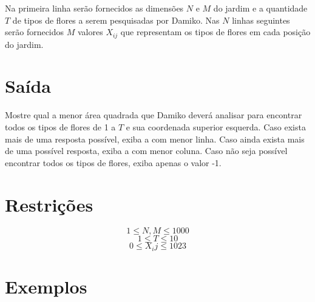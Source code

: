 Na primeira linha serão fornecidos as dimensões $N$ e $M$ do jardim e a quantidade $T$ de tipos de flores a serem pesquisadas por Damiko.
 Nas $N$ linhas seguintes serão fornecidos $M$ valores $X_{ij}$ que representam os tipos de flores em cada posição do jardim.


\section*{Saída}

Mostre qual a menor área quadrada que Damiko deverá analisar para encontrar todos os tipos de flores de 1 a $T$ e sua coordenada superior esquerda.
 Caso exista mais de uma resposta possível, exiba a com menor linha.
 Caso ainda exista mais de uma possível resposta, exiba a com menor coluna.
 Caso não seja possível encontrar todos os tipos de flores, exiba apenas o valor -1.


\section*{Restrições}
$$1 \leq N,M \leq 1000$$
$$1 \leq T \leq 10$$
$$0 \leq X_ij \leq 1023$$

\section*{Exemplos}
\exemplo
